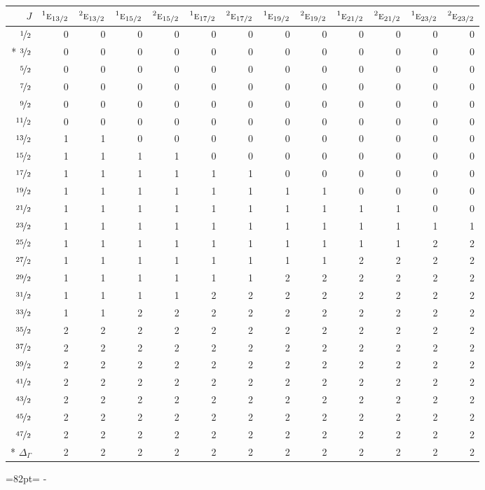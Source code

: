 \documentclass[10pt,a4paper]{article}
\makeatletter
\def\grouprule#1#2{\noalign{\marks\LTgroupmarks{\the\belowrulesep}\nobreak\vskip#1%
  \vskip\aboverulesep}\multispan\LT@cols\unskip{\leaders\hrule\@height#2\hfill\kern\z@}\cr
  \noalign{\penalty\LTrulebreak\vskip\belowrulesep\global\@lastruleclass\z@}}
\newcommand{\needspace}[1]{\par\penalty-100\begingroup\dimen0=#1\relax\dimen2=\pagegoal
  \advance\dimen2-\pagetotal\ifdim\dimen0>\dimen2\relax\ifdim\dimen2>0pt\vfil\break\fi\fi
  \endgroup}
\numberwithin{equation}{section}
\newcommand{\irr}[1]{\text{\normalfont\scshape #1}}
\newcommand{\conjpair}[1]{{}^{#1}}
\makeatother
\begin{document}
{\small\begin{longtable}{@{}rrrrrrrrrrrrr@{}}\toprule
$J$ & $\conjpair{1}\irr{e}_{13/2}$ & $\conjpair{2}\irr{e}_{13/2}$ & $\conjpair{1}\irr{e}_{15/2}$ & $\conjpair{2}\irr{e}_{15/2}$ & $\conjpair{1}\irr{e}_{17/2}$ & $\conjpair{2}\irr{e}_{17/2}$ & $\conjpair{1}\irr{e}_{19/2}$ & $\conjpair{2}\irr{e}_{19/2}$ & $\conjpair{1}\irr{e}_{21/2}$ & $\conjpair{2}\irr{e}_{21/2}$ & $\conjpair{1}\irr{e}_{23/2}$ & $\conjpair{2}\irr{e}_{23/2}$\\\midrule\endhead
\bottomrule\endfoot\endlastfoot
$\nicefrac{1}{2}$ & 0 & 0 & 0 & 0 & 0 & 0 & 0 & 0 & 0 & 0 & 0 & 0\\*
$\nicefrac{3}{2}$ & 0 & 0 & 0 & 0 & 0 & 0 & 0 & 0 & 0 & 0 & 0 & 0\\
$\nicefrac{5}{2}$ & 0 & 0 & 0 & 0 & 0 & 0 & 0 & 0 & 0 & 0 & 0 & 0\\
$\nicefrac{7}{2}$ & 0 & 0 & 0 & 0 & 0 & 0 & 0 & 0 & 0 & 0 & 0 & 0\\
$\nicefrac{9}{2}$ & 0 & 0 & 0 & 0 & 0 & 0 & 0 & 0 & 0 & 0 & 0 & 0\\
$\nicefrac{11}{2}$ & 0 & 0 & 0 & 0 & 0 & 0 & 0 & 0 & 0 & 0 & 0 & 0\\
$\nicefrac{13}{2}$ & 1 & 1 & 0 & 0 & 0 & 0 & 0 & 0 & 0 & 0 & 0 & 0\\
$\nicefrac{15}{2}$ & 1 & 1 & 1 & 1 & 0 & 0 & 0 & 0 & 0 & 0 & 0 & 0\\
$\nicefrac{17}{2}$ & 1 & 1 & 1 & 1 & 1 & 1 & 0 & 0 & 0 & 0 & 0 & 0\\
$\nicefrac{19}{2}$ & 1 & 1 & 1 & 1 & 1 & 1 & 1 & 1 & 0 & 0 & 0 & 0\\
$\nicefrac{21}{2}$ & 1 & 1 & 1 & 1 & 1 & 1 & 1 & 1 & 1 & 1 & 0 & 0\\
$\nicefrac{23}{2}$ & 1 & 1 & 1 & 1 & 1 & 1 & 1 & 1 & 1 & 1 & 1 & 1\\
$\nicefrac{25}{2}$ & 1 & 1 & 1 & 1 & 1 & 1 & 1 & 1 & 1 & 1 & 2 & 2\\
$\nicefrac{27}{2}$ & 1 & 1 & 1 & 1 & 1 & 1 & 1 & 1 & 2 & 2 & 2 & 2\\
$\nicefrac{29}{2}$ & 1 & 1 & 1 & 1 & 1 & 1 & 2 & 2 & 2 & 2 & 2 & 2\\
$\nicefrac{31}{2}$ & 1 & 1 & 1 & 1 & 2 & 2 & 2 & 2 & 2 & 2 & 2 & 2\\
$\nicefrac{33}{2}$ & 1 & 1 & 2 & 2 & 2 & 2 & 2 & 2 & 2 & 2 & 2 & 2\\
$\nicefrac{35}{2}$ & 2 & 2 & 2 & 2 & 2 & 2 & 2 & 2 & 2 & 2 & 2 & 2\\
$\nicefrac{37}{2}$ & 2 & 2 & 2 & 2 & 2 & 2 & 2 & 2 & 2 & 2 & 2 & 2\\
$\nicefrac{39}{2}$ & 2 & 2 & 2 & 2 & 2 & 2 & 2 & 2 & 2 & 2 & 2 & 2\\
$\nicefrac{41}{2}$ & 2 & 2 & 2 & 2 & 2 & 2 & 2 & 2 & 2 & 2 & 2 & 2\\
$\nicefrac{43}{2}$ & 2 & 2 & 2 & 2 & 2 & 2 & 2 & 2 & 2 & 2 & 2 & 2\\
$\nicefrac{45}{2}$ & 2 & 2 & 2 & 2 & 2 & 2 & 2 & 2 & 2 & 2 & 2 & 2\\
$\nicefrac{47}{2}$ & 2 & 2 & 2 & 2 & 2 & 2 & 2 & 2 & 2 & 2 & 2 & 2\\*
\grouprule{0pt}{\lightrulewidth} $\Delta_\Gamma$ & 2 & 2 & 2 & 2 & 2 & 2 & 2 & 2 & 2 & 2 & 2 & 2\\
\bottomrule\end{longtable}}
\needspace{82pt}
\end{document}
